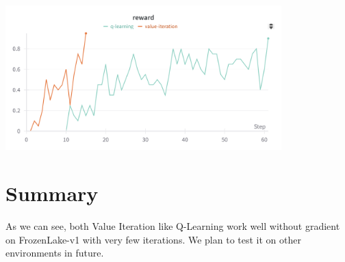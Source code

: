 \documentclass{article}
\begin{document}
\begin{center}
    \includegraphics[width=0.8\textwidth]{reward.png}
\end{center}

\section{Summary}
As we can see, both Value Iteration like Q-Learning work well without gradient on FrozenLake-v1 with very few iterations. We plan to test it on other environments in future.
\end{document}
